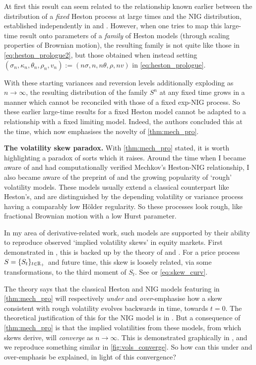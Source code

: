 At first this result can seem related to the relationship known earlier between the distribution of a \emph{fixed} Heston process at large times and the NIG distribution, established independently in \cite{keller-ressel_2011} and \cite{forde_2011}. However, when one tries to map this large-time result onto parameters of a \emph{family} of Heston models (through scaling properties of Brownian motion), the resulting family is not quite like those in \autoref{eq:heston_prologue2}, but those obtained when instead setting $(\sigma_n,\kappa_n,\theta_n,\rho_n,v_n):=(n\sigma,n,n\theta,\rho,nv)$ in \autoref{eq:heston_prologue}.

With these starting variances and reversion levels additionally exploding as $n\to\infty$, the resulting distribution of the family $S^n$ at any fixed time grows in a manner which cannot be reconciled with those of a fixed exp-NIG process. So these earlier large-time results for a fixed Heston model cannot be adapted to a relationship with a fixed limiting model. Indeed, the authors concluded this at the time, which now emphasises the novelty of \autoref{thm:mech_pro}.

\vspace{3mm}\textbf{The volatility skew paradox.} With \autoref{thm:mech_pro} stated, it is worth highlighting a paradox of sorts which it raises. Around the time when I became aware of and had computationally verified Mechkov's Heston-NIG relationship, I also became aware of the preprint of \cite{gatheral_2018} and the growing popularity of `rough' volatility models. These models usually extend a classical counterpart like Heston's, and are distinguished by the depending volatility or variance process having a comparably low H\"older regularity. So these processes look rough, like fractional Brownian motion with a low Hurst parameter.

In my area of derivative-related work, such models are supported by their ability to reproduce observed `implied volatility skews' in equity markets. First demonstrated in \cite{bayer_2016}, this is backed up by the theory of \cite{alos_2007} and \cite{fukasawa_2011}. For a price process $S=\{S_t\}_{t\in\mathbb{R}_+}$ and future time, this skew is loosely related, via some transformations, to the third moment of $S_t$. See \cite{bergomi_2016} or \autoref{eq:skew_curv}.

The theory says that the classical Heston and NIG models featuring in \autoref{thm:mech_pro} will respectively \emph{under} and \emph{over}-emphasise how a skew consistent with rough volatility evolves backwards in time, towards $t=0$. The theoretical justification of this for the NIG model is in \cite{gerhold_2016}. But a consequence of \autoref{thm:mech_pro} is that the implied volatilities from these models, from which skews derive, will \emph{converge} as $n\to\infty$. This is demonstrated graphically in \cite{mechkov_2015}, and we reproduce something similar in \autoref{fig:vols_converge}. So how can this under and over-emphasis be explained, in light of this convergence?

